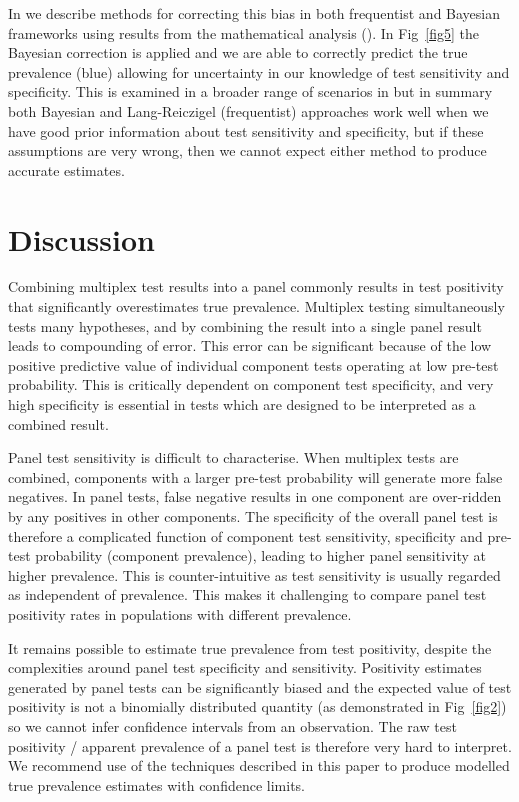 \documentclass[10pt,letterpaper]{article}
\begin{document}
In  we describe methods for correcting this bias in both frequentist and Bayesian frameworks using results from the mathematical analysis (). In Fig~\ref{fig5} the Bayesian correction is applied and we are able to correctly predict the true prevalence (blue) allowing for uncertainty in our knowledge of test sensitivity and specificity. This is examined in a broader range of scenarios in  but in summary both Bayesian and Lang-Reiczigel (frequentist) approaches work well when we have good prior information about test sensitivity and specificity, but if these assumptions are very wrong, then we cannot expect either method to produce accurate estimates.

\section*{Discussion}

Combining multiplex test results into a panel commonly results in test positivity that significantly overestimates true prevalence. Multiplex testing simultaneously tests many hypotheses, and by combining the result into a single panel result leads to compounding of error. This error can be significant because of the low positive predictive value of individual component tests operating at low pre-test probability. This is critically dependent on component test specificity, and very high specificity is essential in tests which are designed to be interpreted as a combined result.

Panel test sensitivity is difficult to characterise. When multiplex tests are combined, components with a larger pre-test probability will generate more false negatives. In panel tests, false negative results in one component are over-ridden by any positives in other components. The specificity of the overall panel test is therefore a complicated function of component test sensitivity, specificity and pre-test probability (component prevalence), leading to higher panel sensitivity at higher prevalence. This is counter-intuitive as test sensitivity is usually regarded as independent of prevalence. This makes it challenging to compare panel test positivity rates in populations with different prevalence.

It remains possible to estimate true prevalence from test positivity, despite the complexities around panel test specificity and sensitivity. Positivity estimates generated by panel tests can be significantly biased and the expected value of test positivity is not a binomially distributed quantity (as demonstrated in Fig~\ref{fig2}) so we cannot infer confidence intervals from an observation. The raw test positivity / apparent prevalence of a panel test is therefore very hard to interpret. We recommend use of the techniques described in this paper to produce modelled true prevalence estimates with confidence limits.
\end{document}
